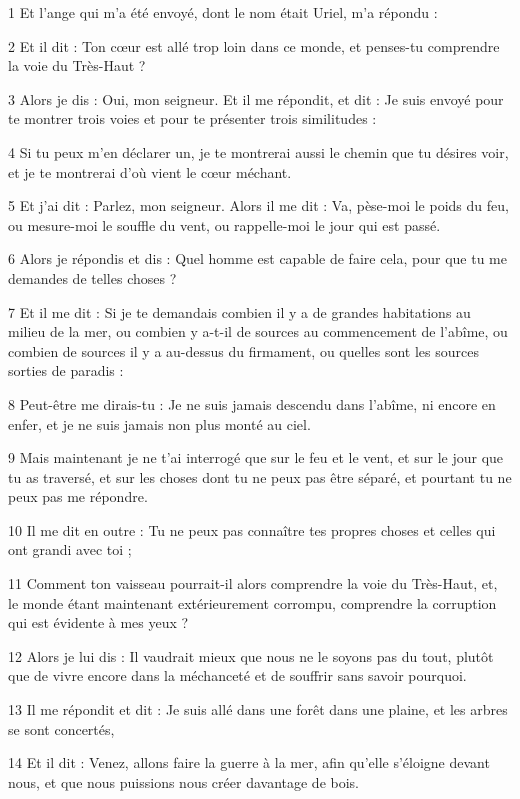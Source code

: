 \par 1 Et l'ange qui m'a été envoyé, dont le nom était Uriel, m'a répondu :
\par 2 Et il dit : Ton cœur est allé trop loin dans ce monde, et penses-tu comprendre la voie du Très-Haut ?
\par 3 Alors je dis : Oui, mon seigneur. Et il me répondit, et dit : Je suis envoyé pour te montrer trois voies et pour te présenter trois similitudes :
\par 4 Si tu peux m'en déclarer un, je te montrerai aussi le chemin que tu désires voir, et je te montrerai d'où vient le cœur méchant.
\par 5 Et j'ai dit : Parlez, mon seigneur. Alors il me dit : Va, pèse-moi le poids du feu, ou mesure-moi le souffle du vent, ou rappelle-moi le jour qui est passé.
\par 6 Alors je répondis et dis : Quel homme est capable de faire cela, pour que tu me demandes de telles choses ?
\par 7 Et il me dit : Si je te demandais combien il y a de grandes habitations au milieu de la mer, ou combien y a-t-il de sources au commencement de l'abîme, ou combien de sources il y a au-dessus du firmament, ou quelles sont les sources sorties de paradis :
\par 8 Peut-être me dirais-tu : Je ne suis jamais descendu dans l'abîme, ni encore en enfer, et je ne suis jamais non plus monté au ciel.
\par 9 Mais maintenant je ne t'ai interrogé que sur le feu et le vent, et sur le jour que tu as traversé, et sur les choses dont tu ne peux pas être séparé, et pourtant tu ne peux pas me répondre.
\par 10 Il me dit en outre : Tu ne peux pas connaître tes propres choses et celles qui ont grandi avec toi ;
\par 11 Comment ton vaisseau pourrait-il alors comprendre la voie du Très-Haut, et, le monde étant maintenant extérieurement corrompu, comprendre la corruption qui est évidente à mes yeux ?
\par 12 Alors je lui dis : Il vaudrait mieux que nous ne le soyons pas du tout, plutôt que de vivre encore dans la méchanceté et de souffrir sans savoir pourquoi.
\par 13 Il me répondit et dit : Je suis allé dans une forêt dans une plaine, et les arbres se sont concertés,
\par 14 Et il dit : Venez, allons faire la guerre à la mer, afin qu'elle s'éloigne devant nous, et que nous puissions nous créer davantage de bois.
